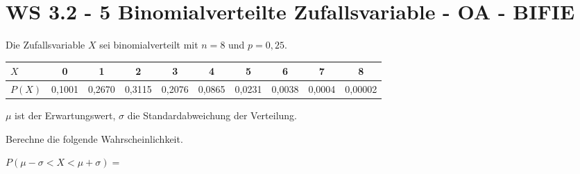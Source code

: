 \section{WS 3.2 - 5 Binomialverteilte Zufallsvariable - OA - BIFIE}

\begin{beispiel}[WS 3.2]{1} %
Die Zufallsvariable $X$ sei binomialverteilt mit $n = 8$ und $p = 0,25$. \leer

\begin{tabular}{|l|c|c|c|c|c|c|c|c|c|} \hline
$X$ & 0&1&2&3&4&5&6&7&8 \\ \hline
$P(X)$&0,1001 &0,2670&0,3115&0,2076&0,0865&0,0231&0,0038&0,0004&0,00002 \\ \hline
\end{tabular} \leer


$\mu$ ist der Erwartungswert, $\sigma$ die Standardabweichung der Verteilung. \leer

Berechne die folgende Wahrscheinlichkeit.\leer

$P(\mu-\sigma < X < \mu + \sigma)=$


\end{beispiel} 